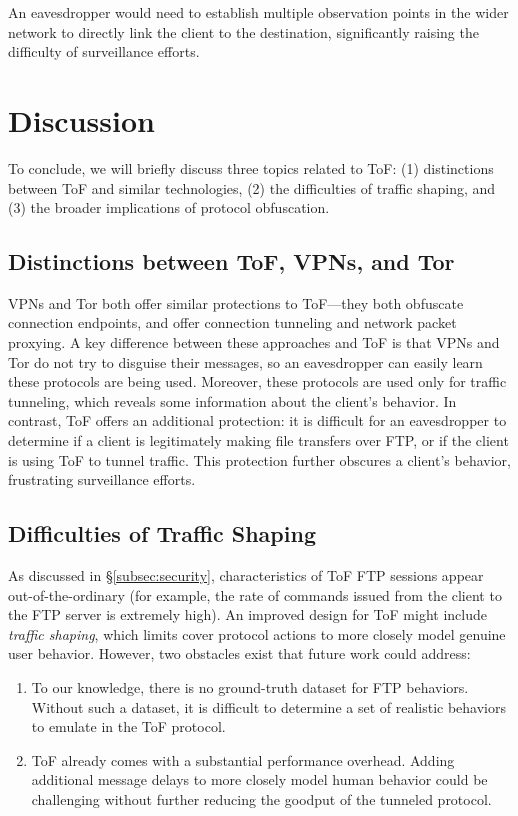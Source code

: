 \documentclass[letterpaper,twocolumn,11pt]{article}
\begin{document}
An eavesdropper would need to establish multiple observation points in the
wider network to directly link the client to the destination, significantly
raising the difficulty of surveillance efforts.

\section{Discussion} \label{sec:discussion}

To conclude, we will briefly discuss three topics related to ToF: (1)
distinctions between ToF and similar technologies, (2) the difficulties of
traffic shaping, and (3) the broader implications of protocol obfuscation.

\subsection{Distinctions between ToF, VPNs, and Tor}

VPNs and Tor both offer similar protections to ToF---they both obfuscate
connection endpoints, and offer connection tunneling and network packet
proxying. A key difference between these approaches and ToF is that VPNs and
Tor do not try to disguise their messages, so an eavesdropper can easily learn
these protocols are being used. Moreover, these protocols are used only for
traffic tunneling, which reveals some information about the client's behavior.
In contrast, ToF offers an additional protection: it is difficult for an
eavesdropper to determine if a client is legitimately making file transfers
over FTP, or if the client is using ToF to tunnel traffic. This protection
further obscures a client's behavior, frustrating surveillance efforts.

\subsection{Difficulties of Traffic Shaping}

As discussed in \S\ref{subsec:security}, characteristics of ToF FTP sessions
appear out-of-the-ordinary (for example, the rate of commands issued from the
client to the FTP server is extremely high). An improved design for ToF might
include \emph{traffic shaping}, which limits cover protocol actions to more
closely model genuine user behavior. However, two obstacles exist that future
work could address:
\begin{enumerate}
  \item To our knowledge, there is no ground-truth dataset for FTP behaviors.
    Without such a dataset, it is difficult to determine a set of realistic
    behaviors to emulate in the ToF protocol.
  \item ToF already comes with a substantial performance overhead. Adding
    additional message delays to more closely model human behavior could be
    challenging without further reducing the goodput of the tunneled protocol.
\end{enumerate}
\end{document}
